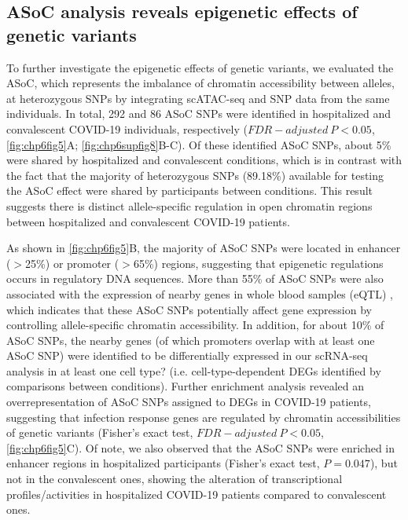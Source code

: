 \documentclass{book}
\begin{document}
\begin{refsection}
\subsection*{ASoC analysis reveals epigenetic effects of genetic variants}
To further investigate the epigenetic effects of genetic variants, we evaluated the ASoC, which represents the imbalance of chromatin accessibility between alleles, at heterozygous SNPs by integrating scATAC-seq and SNP data from the same individuals.
In total, 292 and 86 ASoC SNPs were identified in hospitalized and convalescent COVID-19 individuals, respectively ($FDR-adjusted~P < 0.05$, \ref{fig:chp6fig5}A; \ref{fig:chp6supfig8}B-C).
Of these identified ASoC SNPs, about 5\% were shared by hospitalized and convalescent conditions, which is in contrast with the fact that the majority of heterozygous SNPs (89.18\%) available for testing the ASoC effect were shared by participants between conditions.
This result suggests there is distinct allele-specific regulation in open chromatin regions between hospitalized and convalescent COVID-19 patients.

As shown in \ref{fig:chp6fig5}B, the majority of ASoC SNPs were located in enhancer ($>$25\%) or promoter ($>$65\%) regions, suggesting that epigenetic regulations occurs in regulatory DNA sequences.
More than 55\% of ASoC SNPs were also associated with the expression of nearby genes in whole blood samples (eQTL) \cite{Author2017Genetic}, which indicates that these ASoC SNPs potentially affect gene expression by controlling allele-specific chromatin accessibility.
In addition, for about 10\% of ASoC SNPs, the nearby genes (of which promoters overlap with at least one ASoC SNP) were identified to be differentially expressed in our scRNA-seq analysis in at least one cell type? (i.e. cell-type-dependent DEGs identified by comparisons between conditions).
Further enrichment analysis revealed an overrepresentation of ASoC SNPs assigned to DEGs in COVID-19 patients, suggesting that infection response genes are regulated by chromatin accessibilities of genetic variants (Fisher’s exact test, $FDR-adjusted~P < 0.05$, \ref{fig:chp6fig5}C).
Of note, we also observed that the ASoC SNPs were enriched in enhancer regions in hospitalized participants (Fisher’s exact test, $P = 0.047$), but not in the convalescent ones, showing the alteration of transcriptional profiles/activities in hospitalized COVID-19 patients compared to convalescent ones.


\end{refsection}
\end{document}
